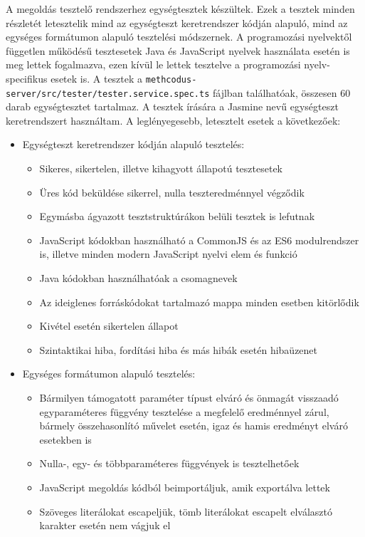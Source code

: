 \documentclass{elteikthesis}
\begin{document}
				A megoldás tesztelő rendszerhez egységtesztek készültek. Ezek a tesztek minden részletét letesztelik mind az egységteszt keretrendszer kódján alapuló, mind az egységes formátumon alapuló tesztelési módszernek. A programozási nyelvektől független működésű tesztesetek Java és JavaScript nyelvek használata esetén is meg lettek fogalmazva, ezen kívül le lettek tesztelve a programozási nyelv-specifikus esetek is. A tesztek a \texttt{methcodus-server/src/tester/tester.service.spec.ts} fájlban találhatóak, összesen 60 darab egységtesztet tartalmaz. A tesztek írására a Jasmine nevű egységteszt keretrendszert használtam. A leglényegesebb, letesztelt esetek a következőek:
				\begin{itemize}
					\item Egységteszt keretrendszer kódján alapuló tesztelés:
					\begin{itemize}
						\setlength\itemsep{-0.5em}
						\item Sikeres, sikertelen, illetve kihagyott állapotú tesztesetek
						\item Üres kód beküldése sikerrel, nulla teszteredménnyel végződik
						\item Egymásba ágyazott tesztstruktúrákon belüli tesztek is lefutnak
						\item JavaScript kódokban használható a CommonJS és az ES6 modulrendszer is, illetve minden modern JavaScript nyelvi elem és funkció
						\item Java kódokban használhatóak a csomagnevek
						\item Az ideiglenes forráskódokat tartalmazó mappa minden esetben kitörlődik
						\item Kivétel esetén sikertelen állapot
						\item Szintaktikai hiba, fordítási hiba és más hibák esetén hibaüzenet
					\end{itemize}
					\item Egységes formátumon alapuló tesztelés:
					\begin{itemize}
						\setlength\itemsep{-0.5em}
						\item Bármilyen támogatott paraméter típust elváró és önmagát visszaadó egyparaméteres függvény tesztelése a megfelelő eredménnyel zárul, bármely összehasonlító művelet esetén, igaz és hamis eredményt elváró esetekben is
						\item Nulla-, egy- és többparaméteres függvények is tesztelhetőek
						\item JavaScript megoldás kódból beimportáljuk, amik exportálva lettek
						\item Szöveges literálokat escapeljük, tömb literálokat escapelt elválasztó karakter esetén nem vágjuk el
					\end{itemize}
				\end{itemize}
			
\end{document}
